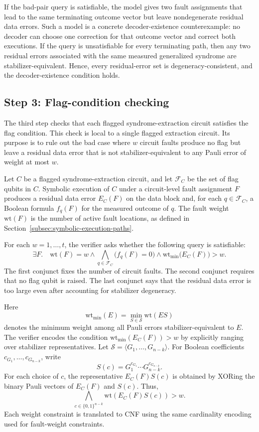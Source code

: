 \documentclass[acmsmall,screen,review,anonymous,nonacm]{acmart}
\begin{document}
If the bad-pair query is satisfiable, the model gives two fault assignments that lead to the same terminating outcome vector but leave nondegenerate residual data errors. Such a model is a concrete decoder-existence counterexample: no decoder can choose one correction for that outcome vector and correct both executions. If the query is unsatisfiable for every terminating path, then any two residual errors associated with the same measured generalized syndrome are stabilizer-equivalent. Hence, every residual-error set is degeneracy-consistent, and the decoder-existence condition holds.

\subsection{Step 3: Flag-condition checking}
\label{subsec:flag-condition-checking}

The third step checks that each flagged syndrome-extraction circuit satisfies the flag condition. This check is local to a single flagged extraction circuit. Its purpose is to rule out the bad case where \(w\) circuit faults produce no flag but leave a residual data error that is not stabilizer-equivalent to any Pauli error of weight at most \(w\).

Let \(C\) be a flagged syndrome-extraction circuit, and let \(\mathcal{F}_C\) be the set of flag qubits in \(C\). Symbolic execution of \(C\) under a circuit-level fault assignment \(F\) produces a residual data error \(E_C(F)\) on the data block and, for each \(q\in\mathcal{F}_C\), a Boolean formula \(f_q(F)\) for the measured outcome of \(q\). The fault weight \(\mathrm{wt}(F)\) is the number of active fault locations, as defined in Section~\ref{subsec:symbolic-execution-paths}.

For each \(w=1,\ldots,t\), the verifier asks whether the following query is satisfiable:
\[
\exists F.\quad
\mathrm{wt}(F)=w
\land
\bigwedge_{q\in\mathcal{F}_C}\bigl(f_q(F)=0\bigr)
\land
\mathrm{wt}_{\min}\bigl(E_C(F)\bigr)>w .
\]
The first conjunct fixes the number of circuit faults. The second conjunct requires that no flag qubit is raised. The last conjunct says that the residual data error is too large even after accounting for stabilizer degeneracy.

Here
\[
\mathrm{wt}_{\min}(E)
=
\min_{S\in\mathcal{S}}\mathrm{wt}(ES)
\]
denotes the minimum weight among all Pauli errors stabilizer-equivalent to \(E\). The verifier encodes the condition \(\mathrm{wt}_{\min}(E_C(F))>w\) by explicitly ranging over stabilizer representatives. Let \(\mathcal{S}=\langle G_1,\ldots,G_{n-k}\rangle\). For Boolean coefficients \(c_{G_1},\ldots,c_{G_{n-k}}\), write
\[
S(c)=G_1^{c_{G_1}}\cdots G_{n-k}^{c_{G_{n-k}}}.
\]
For each choice of \(c\),
the representative \(E_C(F)S(c)\)
is obtained by XORing the binary Pauli vectors
of \(E_C(F)\) and \(S(c)\).
Thus,
\[
\bigwedge_{c\in\{0,1\}^{n-k}}
\mathrm{wt}(E_C(F)S(c))>w .
\]
Each weight constraint is translated to CNF using
the same cardinality encoding used for fault-weight constraints.
\end{document}
